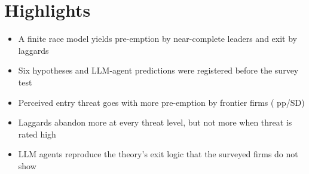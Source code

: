 \documentclass[12pt]{article}
\begin{document}
\section*{Highlights}
\begin{itemize}
\item A finite race model yields pre-emption by near-complete leaders and exit by laggards
\item Six hypotheses and LLM-agent predictions were registered before the survey test
\item Perceived entry threat goes with more pre-emption by frontier firms (\KISHOnePp{} pp/SD)
\item Laggards abandon more at every threat level, but not more when threat is rated high
\item LLM agents reproduce the theory's exit logic that the surveyed firms do not show
\end{itemize}
\end{document}
